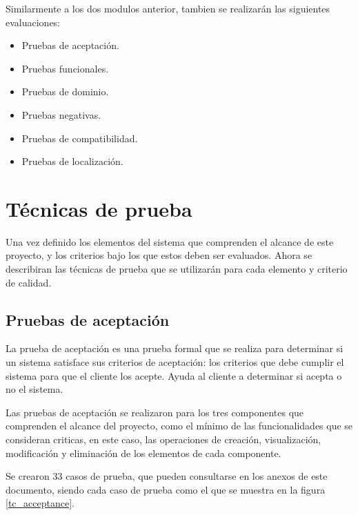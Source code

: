 Similarmente a los dos modulos anterior, tambien se realizarán las siguientes
evaluaciones:

\begin{itemize}
\item Pruebas de aceptación.
\item Pruebas funcionales.
\item Pruebas de dominio.
\item Pruebas negativas.
\item Pruebas de compatibilidad.
\item Pruebas de localización.
\end{itemize}

\section{Técnicas de prueba}
Una vez definido los elementos del sistema que comprenden el alcance de este
proyecto, y los criterios bajo los que estos deben ser evaluados. Ahora se
describiran las técnicas de prueba que se utilizarán para cada elemento y
criterio de calidad.

\subsection{Pruebas de aceptación}
La prueba de aceptación es una prueba formal que se realiza para determinar si
un sistema satisface sus criterios de aceptación: los criterios que debe cumplir
el sistema para que el cliente los acepte. Ayuda al cliente a determinar si
acepta o no el sistema\cite{Naik}.

Las pruebas de aceptación se realizaron para los tres componentes que comprenden
el alcance del proyecto, como el mínimo de las funcionalidades que se consideran
criticas, en este caso, las operaciones de creación, visualización, modificación
y eliminación de los elementos de cada componente.

Se crearon 33 casos de prueba, que pueden consultarse en los anexos de este
documento, siendo cada caso de prueba como el que se muestra en la figura
\ref{tc_acceptance}.

